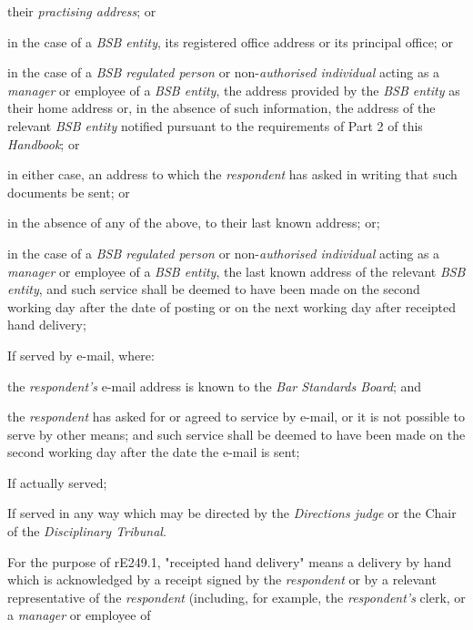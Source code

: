 their \emph{practising address}; or\\
\item in the case of a \emph{BSB entity}, its registered office address or
its principal office; or\\
\item in the case of a \emph{BSB regulated person} or non-\emph{authorised
individual} acting as a \emph{manager} or employee of a \emph{BSB
entity}, the address provided by the \emph{BSB entity} as their home
address or, in the absence of such information, the address of the
relevant \emph{BSB entity} notified pursuant to the requirements of Part
2 of this \emph{Handbook}; or\\
\item in either case, an address to which the \emph{respondent} has asked
in writing that such documents be sent; or\\
\item in the absence of any of the above, to their last known address;
or;\\
\item in the case of a \emph{BSB regulated person} or non-\emph{authorised
individual} acting as a \emph{manager }or employee of a \emph{BSB
entity}, the last known address of the relevant \emph{BSB entity},\la
and such service shall be deemed to have been made on the second working
day after the date of posting or on the next working day after receipted
hand delivery;\item If served by e-mail, where:\al
\item  the \emph{respondent's} e-mail address is known to the \emph{Bar
Standards Board}; and\\
\item the \emph{respondent} has asked for or agreed to service by e-mail,
or it is not possible to serve by other means;\la
and such service shall be deemed to have been made on the second working
day after the date the e-mail is sent;\item If actually served;\item If served in any way which may be directed by the \emph{Directions
judge} or the Chair of the\emph{ Disciplinary Tribunal}.\ln
{}\par
For the purpose of rE249.1, "receipted hand delivery" means  a delivery
by hand which is acknowledged by a receipt signed by
the \emph{respondent} or by a relevant representative of
the \emph{respondent} (including, for example,
the \emph{respondent's} clerk, or a \emph{manager} or employee of
